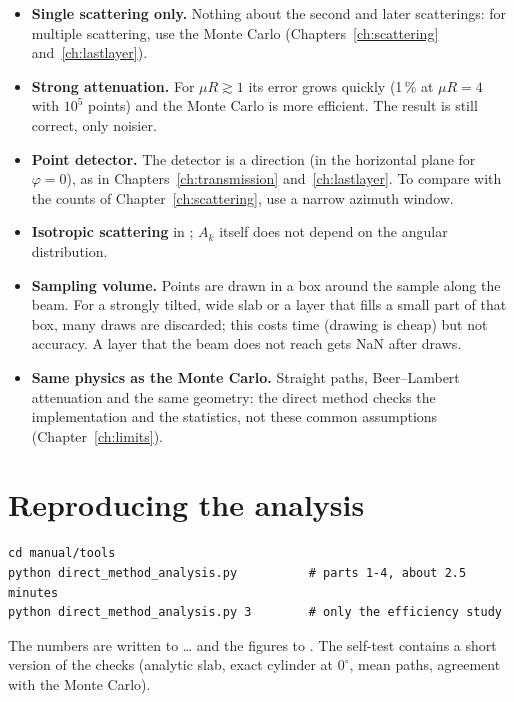 \begin{warn}
\begin{itemize}
  \item \textbf{Single scattering only.} Nothing about the second and later scatterings: for multiple scattering, use the Monte Carlo
        (Chapters~\ref{ch:scattering} and~\ref{ch:lastlayer}).
  \item \textbf{Strong attenuation.} For $\mu R\gtrsim1$ its error grows quickly (1\,\% at $\mu R=4$ with $10^5$ points) and the Monte Carlo is more
        efficient. The result is still correct, only noisier.
  \item \textbf{Point detector.} The detector is a direction (in the horizontal plane for $\varphi=0$), as in Chapters~\ref{ch:transmission}
        and~\ref{ch:lastlayer}. To compare with the counts of Chapter~\ref{ch:scattering}, use a narrow azimuth window.
  \item \textbf{Isotropic scattering} in ; $A_k$ itself does not depend on the angular distribution.
  \item \textbf{Sampling volume.} Points are drawn in a box around the sample along the beam. For a strongly tilted, wide slab or a layer that
        fills a small part of that box, many draws are discarded; this costs time (drawing is cheap) but not accuracy. A layer that the beam does not
        reach gets NaN after  draws.
  \item \textbf{Same physics as the Monte Carlo.} Straight paths, Beer--Lambert attenuation and the same geometry: the direct method checks the
        implementation and the statistics, not these common assumptions (Chapter~\ref{ch:limits}).
\end{itemize}
\end{warn}

\section{Reproducing the analysis}

\begin{lstlisting}[style=shell]
cd manual/tools
python direct_method_analysis.py          # parts 1-4, about 2.5 minutes
python direct_method_analysis.py 3        # only the efficiency study
\end{lstlisting}
The numbers are written to  \dots{}  and the figures to .
The self-test  contains a short version of the checks (analytic slab, exact cylinder at $0^\circ$, mean paths, agreement
with the Monte Carlo).
